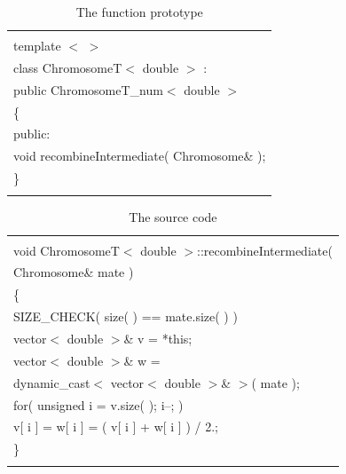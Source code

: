 \documentclass[twocolumn]{article}
\begin{document}
\begin{table}[h]
\begin{center}
\caption{The function prototype}
\label{FP9}
{\scriptsize
\begin{tabular}{|l|}\hline
\hspace*{7cm}\\
template $<$ $>$\\
class ChromosomeT$<$ double $>$ : \\
\hspace*{4mm} public ChromosomeT\_num$<$ double $>$\\
\{\\
\hspace*{4mm} public:\\
\hspace*{8mm} void recombineIntermediate( Chromosome\& );\\
\}\\
\hspace*{7cm}\\\hline
\end{tabular}
}
\end{center}
\end{table}

\begin{table}[h]
\begin{center}
\caption{The source code}
\label{SC9}
{\scriptsize
\begin{tabular}{|l|}\hline
\hspace*{7cm}\\
void ChromosomeT$<$ double $>$::recombineIntermediate( \\
\hspace*{4mm} Chromosome\& mate )\\
\{\\
\hspace*{4mm} SIZE\_CHECK( size( ) == mate.size( ) )\\
\hspace*{4mm} vector$<$ double $>$\& v = *this;\\
\hspace*{4mm} vector$<$ double $>$\& w = \\
\hspace*{4mm} dynamic\_cast$<$ vector$<$ double $>$\& $>$( mate );\\
\hspace*{4mm} for( unsigned i = v.size( ); i--; )\\
\hspace*{8mm} v[ i ] = w[ i ] = ( v[ i ] + w[ i ] ) / 2.;\\
\}\\
\hspace*{7cm}\\\hline
\end{tabular}
}
\end{center}
\end{table}
\end{document}
